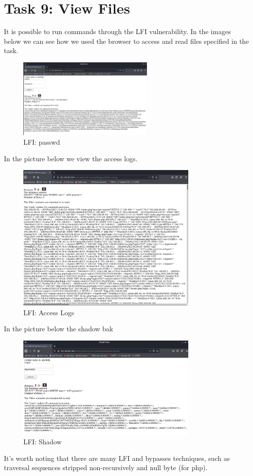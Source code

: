 \section{Task 9: View Files}
\label{task9-view-files}
It is possible to run commands through the LFI vulnerability. In the images below
we can see how we used the browser to access and read files specified in the task.
\begin{figure}[H]
  \centering
  \includegraphics[width=0.6\textwidth]{figures/passwd}
  \caption{LFI: passwd}
  \label{f:passwd}
\end{figure}

In the picture below we view the access logs.
\begin{figure}[H]
  \centering
  \includegraphics[width=0.8\textwidth]{figures/task9-access-log}
  \caption{LFI: Access Logs}
  \label{f:task9-access-log}
\end{figure}

In the picture below the shadow bak
\begin{figure}[H]
  \centering
  \includegraphics[width=0.8\textwidth]{figures/shadow-bak}
  \caption{LFI: Shadow}
  \label{f:shadow-bak}
\end{figure}

It's worth noting that there are many LFI and bypasses techniques, such as
traversal sequences stripped non-recursively and null byte (for php).
